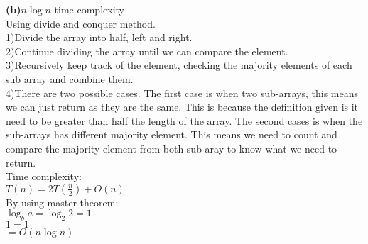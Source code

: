 \documentclass[a4paper, 11pt]{article}
\renewcommand{\part}[1] {\vspace{.10in} {\bf (#1)}}
\begin{document}
\part{b}{$n\log n$ time complexity}\\
Using divide and conquer method.\\
1)Divide the array into half, left and right.\\
2)Continue dividing the array until we can compare the element.\\
3)Recursively keep track of the element, checking the majority elements of each sub array and combine them.\\
4)There are two possible cases. The first case is when two sub-arrays, this means we can just return as they are the same. This is because the definition given is it need to be greater than half the length of the array. The second cases is when the sub-arrays has different majority element. This means we need to count and compare the majority element from both sub-aray to know what we need to return.\\
Time complexity:\\
$T(n) = 2T(\frac{n}{2})+O(n)$\\
By using master theorem:\\
$\log_{b} a = \log_{2} 2 = 1$\\
$1 = 1$\\
$= O(n\log n)$
\end{document}

